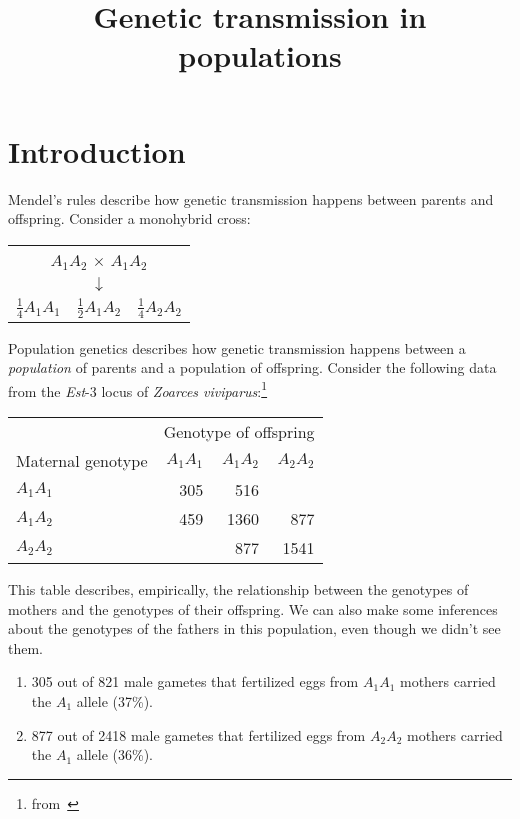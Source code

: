 \documentclass[12pt]{article}
\title{Genetic transmission in populations}
\begin{document}
\maketitle

\thispagestyle{first}

\section*{Introduction}

Mendel's rules describe how genetic transmission happens between
parents and offspring. Consider a monohybrid cross:

\begin{center}
\begin{tabular}{ccc}
\multicolumn{3}{c}{$A_1A_2$ $\times$ $A_1A_2$} \\
 & $\downarrow$ & \\
$\frac{1}{4}A_1A_1$ & $\frac{1}{2}A_1A_2$ & $\frac{1}{4}A_2A_2$ \\
\end{tabular}
\end{center}

\noindent Population genetics describes how genetic transmission
happens between a {\it population\/} of parents and a population of
offspring.  Consider the following data from the {\it
  Est\/}-3 locus of {\it Zoarces
  viviparus}:\footnote{from~\cite{Christiansen-1980}}

\begin{center}
\begin{tabular}{lrrr}
                  & \multicolumn{3}{c}{Genotype of offspring} \\
Maternal genotype & $A_1A_1$ & $A_1A_2$ & $A_2A_2$ \\
\hline
$A_1A_1$          &      305 &      516 & \\
$A_1A_2$          &      459 &     1360 & 877 \\
$A_2A_2$          &          &      877 & 1541 \\
\end{tabular}
\end{center}

\noindent This table describes, empirically, the relationship between
the genotypes of mothers and the genotypes of their offspring. We can
also make some inferences about the genotypes of the fathers in this
population, even though we didn't see them.

\begin{enumerate}

\item 305 out of 821 male gametes that fertilized eggs from $A_1A_1$
mothers carried the $A_1$ allele (37\%).

\item 877 out of 2418 male gametes that fertilized eggs from $A_2A_2$
mothers carried the $A_1$ allele (36\%).

\end{enumerate}
\end{document}
